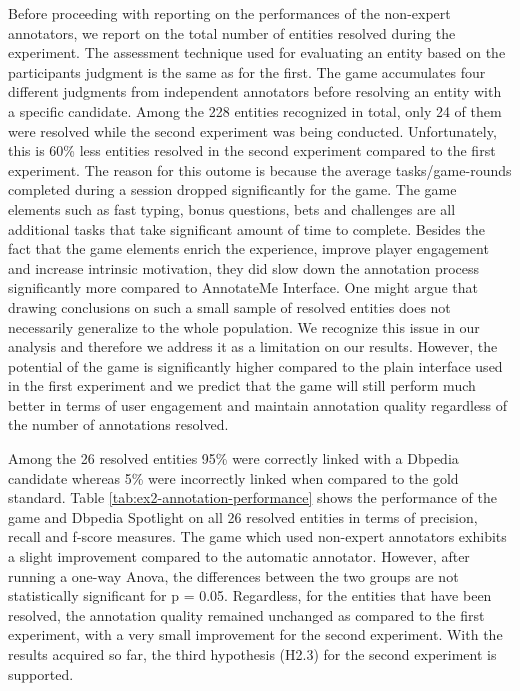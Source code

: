 Before proceeding with reporting on the performances of the non-expert annotators, we report on the total number of entities resolved during the experiment. The assessment technique used for evaluating an entity based on the participants judgment is the same as for the first. The game accumulates four different judgments from independent annotators before resolving an entity with a specific candidate. Among the 228 entities recognized in total, only 24 of them were resolved while the second experiment was being conducted. Unfortunately, this is 60\% less entities resolved in the second experiment compared to the first experiment. The reason for this outome is because the average tasks/game-rounds completed during a session dropped significantly for the game. The game elements such as fast typing, bonus questions, bets and challenges are all additional tasks that take significant amount of time to complete. Besides the fact that the game elements enrich the experience, improve player engagement and increase intrinsic motivation, they did slow down the annotation process significantly more compared to AnnotateMe Interface. One might argue that drawing conclusions on such a small sample of resolved entities does not necessarily generalize to the whole population. We recognize this issue in our analysis and therefore we address it as a limitation on our results. However, the potential of the game is significantly higher compared to the plain interface used in the first experiment and we predict that the game will still perform much better in terms of user engagement and maintain annotation quality regardless of the number of annotations resolved. 

Among the 26 resolved entities 95\% were correctly linked with a Dbpedia candidate whereas 5\% were incorrectly linked when compared to the gold standard. Table \ref{tab:ex2-annotation-performance} shows the performance of the game and Dbpedia Spotlight on all 26 resolved entities in terms of precision, recall and f-score measures. The game which used non-expert annotators exhibits a slight improvement compared to the automatic annotator. However, after running a one-way Anova, the differences between the two groups are not statistically significant for p = 0.05. Regardless, for the entities that have been resolved, the annotation quality remained unchanged as compared to the first experiment, with a very small improvement for the second experiment. With the results acquired so far, the third hypothesis (H2.3) for the second experiment is supported. 

